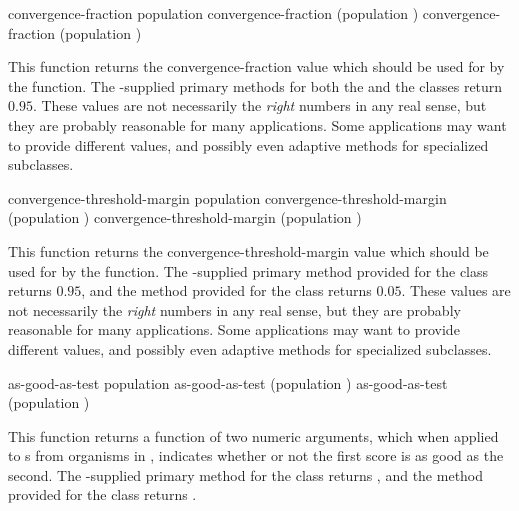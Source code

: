{%

\filbreak

{\samepage
\Defgeneric convergence-fraction {population}
 convergence-fraction {(population )}
 convergence-fraction {(population )}

This function returns the convergence-fraction value which should be used for
 by the  function. The \geco-supplied
primary methods for both the  and the
 classes return $0.95$. These values are not
necessarily the {\em right} numbers in any real sense, but they are probably
reasonable for many applications. Some applications may want to provide different
values, and possibly even adaptive methods for specialized subclasses.
\par}%

\filbreak

{\samepage
\Defgeneric convergence-threshold-margin {population}
 convergence-threshold-margin {(population )}
 convergence-threshold-margin {(population )}

This function returns the convergence-threshold-margin value which should be used
for  by the  function. The \geco-supplied
primary method provided for the  class returns
$0.95$, and the method provided for the  class
returns $0.05$. These values are not necessarily the {\em right} numbers in any real
sense, but they are probably reasonable for many applications. Some applications may
want to provide different values, and possibly even adaptive methods for specialized
subclasses. 
\par}%

\filbreak

{\samepage
\Defgeneric as-good-as-test {population}
 as-good-as-test {(population )}
 as-good-as-test {(population )}

This function returns a function of two numeric arguments, which when applied to
s from organisms in , indicates whether or not the first
score is as good as the second. The \geco-supplied primary method for the
 class returns , and the method provided
for the  class returns .
\par}%

}
